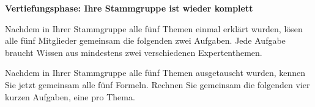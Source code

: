\documentclass[addpoints,11pt,a4paper]{exam}
\begin{document}
\textbf{Vertiefungsphase: Ihre Stammgruppe ist wieder komplett}

Nachdem in Ihrer Stammgruppe alle fünf Themen einmal erklärt wurden, lösen
alle fünf Mitglieder gemeinsam die folgenden zwei Aufgaben. Jede Aufgabe
braucht Wissen aus mindestens zwei verschiedenen Expertenthemen.

\needspace{16cm}
\begin{questions}
\setcounter{question}{5}
\begin{groupbox}
\question[8] Nachdem in Ihrer Stammgruppe alle fünf Themen ausgetauscht
wurden, kennen Sie jetzt gemeinsam alle fünf Formeln. Rechnen Sie
gemeinsam die folgenden vier kurzen Aufgaben, eine pro Thema.
\end{groupbox}
\end{questions}
\end{document}
